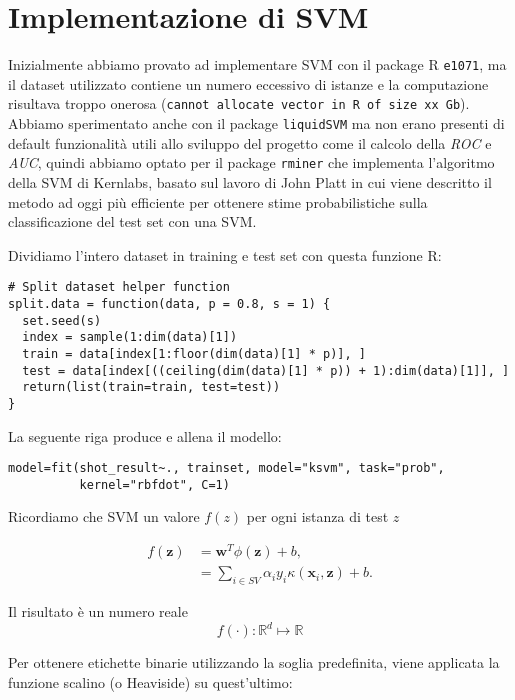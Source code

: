 \section{Implementazione di SVM}

Inizialmente abbiamo provato ad implementare SVM con il package R \texttt{e1071}, ma il dataset utilizzato contiene un numero eccessivo di istanze e la computazione risultava troppo onerosa (\texttt{cannot allocate vector in R of size xx Gb}). Abbiamo sperimentato anche con il package \texttt{liquidSVM} ma non erano presenti di default funzionalità utili allo sviluppo del progetto come il calcolo della \textit{ROC} e \textit{AUC}, quindi abbiamo optato per il package \texttt{rminer} che implementa l'algoritmo della SVM di Kernlabs, basato sul lavoro di John Platt \cite{Platt99probabilisticoutputs} in cui viene descritto il metodo ad oggi più efficiente per ottenere stime probabilistiche sulla classificazione del test set con una SVM.

Dividiamo l'intero dataset in training e test set con questa funzione R:

\begin{verbatim}
# Split dataset helper function
split.data = function(data, p = 0.8, s = 1) {
  set.seed(s)
  index = sample(1:dim(data)[1])
  train = data[index[1:floor(dim(data)[1] * p)], ]
  test = data[index[((ceiling(dim(data)[1] * p)) + 1):dim(data)[1]], ]
  return(list(train=train, test=test))
}
\end{verbatim}

La seguente riga produce e allena il modello:

\begin{verbatim}
model=fit(shot_result~., trainset, model="ksvm", task="prob", 
          kernel="rbfdot", C=1)
\end{verbatim}

Ricordiamo che SVM un valore $ f(z) $ per ogni istanza di test $z$

\begin{align}
f(\mathbf{z}) &= \mathbf{w}^T\phi(\mathbf{z}) + b, \\
&= \sum_{i\in SV} \alpha_i y_i \kappa(\mathbf{x}_i,\mathbf{z}) + b.
\end{align}

Il risultato è un numero reale 
$$f(\cdot):\mathbb{R}^d \mapsto \mathbb{R}$$

Per ottenere etichette binarie utilizzando la soglia predefinita, viene applicata la funzione scalino (o Heaviside) su quest'ultimo:


